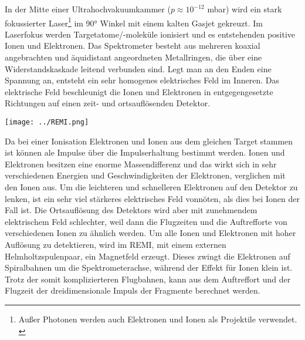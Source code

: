 In der Mitte einer Ultrahochvakuumkammer ($p \approx 10^{-12}$ mbar) wird ein stark fokussierter Laser\footnote{Außer Photonen werden auch Elektronen und Ionen als Projektile verwendet. \cite{ullrich2003}} im 90° Winkel mit einem kalten Gasjet gekreuzt. Im Laserfokus werden Targetatome/-moleküle ionisiert und es entstehenden positive Ionen und Elektronen.
%
Das Spektrometer besteht aus mehreren koaxial angebrachten und äquidistant angeordneten Metallringen, die über eine Widerstandskaskade leitend verbunden sind. Legt man an den Enden eine Spannung an, entsteht ein sehr homogenes elektrisches Feld im Inneren. Das elektrische Feld beschleunigt die Ionen und Elektronen in entgegengesetzte Richtungen auf einen zeit- und ortsauflösenden Detektor. 
%
\begin{center}
\begin{minipage}{\linewidth}
\centering
\texttt{[image: ../REMI.png]}%
 \label{fig:REMI} 
\end{minipage} 
\end{center} 
%
%

Da bei einer Ionisation Elektronen und Ionen aus dem gleichen Target stammen ist können ale Impulse über die Impulserhaltung bestimmt werden. Ionen und Elektronen besitzen eine enorme Massendifferenz %
und das wirkt sich in sehr verschiedenen Energien und Geschwindigkeiten der Elektronen, verglichen mit den Ionen aus. Um die leichteren und schnelleren Elektronen auf den Detektor zu lenken, ist  ein sehr viel stärkeres elektrisches Feld vonnöten, als dies bei Ionen der Fall ist. Die Ortsauflösung des Detektors wird aber mit zunehmendem elektrischem Feld schlechter, weil dann die Flugzeiten und die Auftrefforte von verschiedenen Ionen zu ähnlich werden.
Um alle Ionen und Elektronen mit hoher Auflösung zu detektieren, wird im REMI, mit einem externen Helmholtzspulenpaar, ein Magnetfeld erzeugt. Dieses zwingt die Elektronen auf Spiralbahnen um die Spektrometerachse, während der Effekt für Ionen klein ist. Trotz der somit komplizierteren Flugbahnen, kann aus dem Auftreffort und der Flugzeit der dreidimensionale Impuls der Fragmente berechnet werden. 

